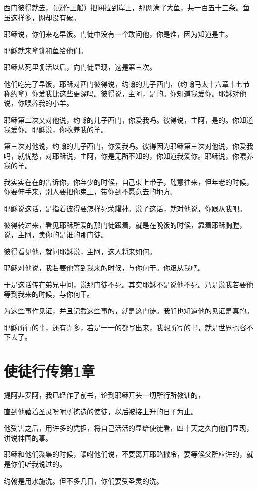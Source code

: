 \documentclass[12pt,oneside]{book}
\begin{document}
西门彼得就去，（或作上船）把网拉到岸上，那网满了大鱼，共一百五十三条。鱼虽这样多，网却没有破。

耶稣说，你们来吃早饭。门徒中没有一个敢问他，你是谁，因为知道是主。

耶稣就来拿饼和鱼给他们。

耶稣从死里复活以后，向门徒显现，这是第三次。

他们吃完了早饭，耶稣对西门彼得说，约翰的儿子西门，（约翰马太十六章十七节称约拿）你爱我比这些更深吗。彼得说，主阿，是的。你知道我爱你。耶稣对他说，你喂养我的小羊。

耶稣第二次又对他说，约翰的儿子西门，你爱我吗。彼得说，主阿，是的。你知道我爱你。耶稣说，你牧养我的羊。

第三次对他说，约翰的儿子西门，你爱我吗。彼得因为耶稣第三次对他说，你爱我吗，就忧愁，对耶稣说，主阿，你是无所不知的，你知道我爱你。耶稣说，你喂养我的羊。

我实实在在的告诉你，你年少的时候，自己束上带子，随意往来，但年老的时候，你要伸手来，别人要把你束上，带你到不愿意去的地方。

耶稣说这话，是指着彼得要怎样死荣耀神。说了这话，就对他说，你跟从我吧。

彼得转过来，看见耶稣所爱的那门徒跟着，就是在晚饭的时候，靠着耶稣胸膛，说，主阿，卖你的是谁的那门徒。

彼得看见他，就问耶稣说，主阿，这人将来如何。

耶稣对他说，我若要他等到我来的时候，与你何干。你跟从我吧。

于是这话传在弟兄中间，说那门徒不死。其实耶稣不是说他不死。乃是说我若要他等到我来的时候，与你何干。

为这些事作见证，并且记载这些事的，就是这门徒。我们也知道他的见证是真的。

耶稣所行的事，还有许多，若是一一的都写出来，我想所写的书，就是世界也容不下去了。

\chapter{使徒行传第1章}
提阿非罗阿，我已经作了前书，论到耶稣开头一切所行所教训的，

直到他藉着圣灵吩咐所拣选的使徒，以后被接上升的日子为止。

他受害之后，用许多的凭据，将自己活活的显给使徒看，四十天之久向他们显现，讲说神国的事。

耶稣和他们聚集的时候，嘱咐他们说，不要离开耶路撒冷，要等候父所应许的，就是你们听我说过的。

约翰是用水施洗。但不多几日，你们要受圣灵的洗。
\end{document}
